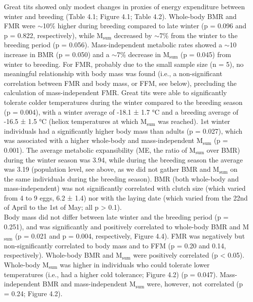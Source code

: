 \documentclass[10pt, twoside]{book} %
\begin{document}
Great tits showed only modest changes in proxies of energy expenditure between winter and breeding (Table 4.1; Figure 4.1; Table 4.2). Whole-body BMR and FMR were $\sim$10\% higher during breeding compared to late winter (p = 0.096 and p = 0.822, respectively), while M$_{\text{sum}}$ decreased by $\sim$7\% from the winter to the breeding period (p = 0.056). Mass-independent metabolic rates showed a $\sim$10 increase in BMR (p = 0.050) and a $\sim$7\% decrease in M$_{\text{sum}}$ (p = 0.045) from winter to breeding. For FMR, probably due to the small sample size (n = 5), no meaningful relationship with body mass was found (i.e., a non-significant correlation between FMR and body mass, or FFM, see below), precluding the calculation of mass-independent FMR. Great tits were able to significantly tolerate colder temperatures during the winter compared to the breeding season (p = 0.004), with a winter average of -18.1 ± 1.7 °C and a breeding average of -16.5 ± 1.5 °C (heliox temperatures at which M$_{\text{sum}}$ was reached). 1st winter individuals had a significantly higher body mass than adults (p = 0.027), which was associated with a higher whole-body and mass-independent M$_{\text{sum}}$ (p = 0.001). The average metabolic expansibility (ME, the ratio of M$_{\text{sum}}$ over BMR) during the winter season was 3.94, while during the breeding season the average was 3.19 (population level, see above, as we did not gather BMR and M$_{\text{sum}}$ on the same individuals during the breeding season). BMR (both whole-body and mass-independent) was not significantly correlated with clutch size (which varied from 4 to 9 eggs, 6.2 ± 1.4) nor with the laying date (which varied from the 22nd of April to the 1st of May; all p > 0.1).\\

Body mass did not differ between late winter and the breeding period (p = 0.251), and was significantly and positively correlated to whole-body BMR and M$_{\text{sum}}$ (p = 0.021 and p = 0.004, respectively, Figure 4.4). FMR was negatively but non-significantly correlated to body mass and to FFM (p = 0.20 and 0.14, respectively). Whole-body BMR and M$_{\text{sum}}$ were positively correlated (p < 0.05). Whole-body M$_{\text{sum}}$ was higher in individuals who could tolerate lower temperatures (i.e., had a higher cold tolerance; Figure 4.2) (p = 0.047). Mass-independent BMR and mass-independent M$_{\text{sum}}$ were, however, not correlated (p = 0.24; Figure 4.2).

\clearpage
\end{document}
